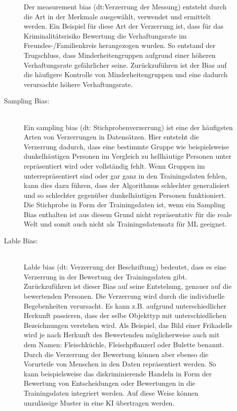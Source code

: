 \begin{onehalfspace}
\begin{description}
\begin{description}
                Der \glqq{}measurement bias\grqq{} (\ac*{dt}:Verzerrung der Messung) entsteht durch die Art in der Merkmale ausgewählt, verwendet und ermittelt werden. Ein Beispiel für diese Art der Verzerrung ist, dass für das Kriminalitätsrisiko Bewertung die Verhaftungsrate im Freundes-/Familienkreis herangezogen wurden. So entstand der Trugschluss, dass Minderheitengruppen aufgrund einer höheren Verhaftungsrate gefährlicher seine. Zurückzuführen ist der Bias auf die häufigere Kontrolle von Minderheitengruppen und eine dadurch verursachte höhere Verhaftungsrate.\cite{silberg2019notes}\cite{srinivasan2021biases}\cite{Mehrabi2021}
                \item [Sampling Bias:] \hfill \\
                Ein \glqq{}sampling bias\grqq{} (\ac*{dt}: Stichprobenverzerrung) ist eine der häufigsten Arten von Verzerrungen in Datensätzen. Hier entsteht die Verzerrung dadurch, dass eine bestimmte Gruppe wie beispielsweise dunkelhäutigen Personen im Vergleich zu hellhäutige Personen unter repräsentiert wird oder vollständig fehlt. Wenn Gruppen im unterrepräsentiert sind oder gar ganz in den Trainingsdaten fehlen, kann dies dazu führen, dass der Algorithmus schlechter generalisiert und so schlechter gegenüber dunkelhäutigen Personen funktioniert. Die Stichprobe in Form der Trainingsdaten ist, wenn ein Sampling Bias enthalten ist aus diesem Grund nicht repräsentativ für die reale Welt und somit auch nicht als Trainingsdatensatz für \ac*{ML} geeignet.\cite{srinivasan2021biases}\cite{Mehrabi2021}
                \item [Lable Bias:] \hfill \\
                \glqq{}Lable bias\grqq{} (\ac*{dt}: Verzerrung der Beschriftung) bedeutet, dass es eine Verzerrung in der Bewertung der Trainingsdaten gibt. Zurückzuführen ist dieser Bias auf seine Entstehung, genauer auf die bewertenden Personen. Die Verzerrung wird durch die individuelle Begebenheiten verursacht. Es kann z.B. aufgrund unterschiedlicher Herkunft passieren, dass der selbe Objekttyp mit unterschiedlichen Bezeichnungen verstehen wird. Als Beispiel, das Bild einer Frikadelle wird je nach Herkunft des Bewertenden möglicherweise auch mit dem Namen: Fleischküchle, Fleischpflanzerl oder Bulette benannt.
                Durch die Verzerrung der Bewertung können aber ebenso die Vorurteile von Menschen in den Daten repräsentiert werden. So kann beispielsweise das diskriminierende Handeln in Form der Bewertung von Entscheidungen oder Bewertungen in die Trainingsdaten integriert werden. Auf diese Weise können unzulässige Muster in eine \ac*{KI} übertragen werden.\cite{srinivasan2021biases}
            \end{description}
            

\end{description}
\end{onehalfspace}
